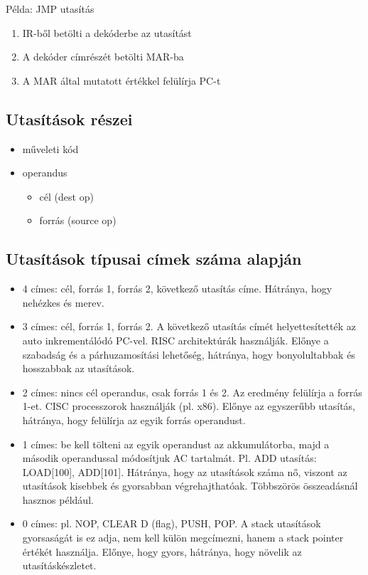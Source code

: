 Példa: JMP utasítás
\begin{enumerate}
    \item IR-ből betölti a dekóderbe az utasítást
    \item A dekóder címrészét betölti MAR-ba
    \item A MAR által mutatott értékkel felülírja PC-t
\end{enumerate}

\subsection{Utasítások részei}
\begin{itemize}
    \item műveleti kód
    \item operandus
    \begin{itemize}
        \item cél (dest op)
        \item forrás (source op)
    \end{itemize}
\end{itemize}

\subsection{Utasítások típusai címek száma alapján}
\begin{itemize}
    \item 4 címes: cél, forrás 1, forrás 2, következő utasítás címe. Hátránya, hogy nehézkes és merev.
    \item 3 címes: cél, forrás 1, forrás 2. A következő utasítás címét helyettesítették az auto inkrementálódó PC-vel. RISC architektúrák használják. Előnye a szabadság és a párhuzamosítási lehetőség, hátránya, hogy bonyolultabbak és hosszabbak az utasítások.
    \item 2 címes: nincs cél operandus, csak forrás 1 és 2. Az eredmény felülírja a forrás 1-et. CISC processzorok használják (pl. x86). Előnye az egyszerűbb utasítás, hátránya, hogy felülírja az egyik forrás operandust.
    \item 1 címes: be kell tölteni az egyik operandust az akkumulátorba, majd a második operandussal módosítjuk AC tartalmát. Pl. ADD utasítás: LOAD[100], ADD[101]. Hátránya, hogy az utasítások száma nő, viszont az utasítások kisebbek és gyorsabban végrehajthatóak. Többszörös összeadásnál hasznos például.
    \item 0 címes: pl. NOP, CLEAR D (flag), PUSH, POP. A stack utasítások gyorsaságát is ez adja, nem kell külön megcímezni, hanem a stack pointer értékét használja. Előnye, hogy gyors, hátránya, hogy növelik az utasításkészletet.
\end{itemize}

